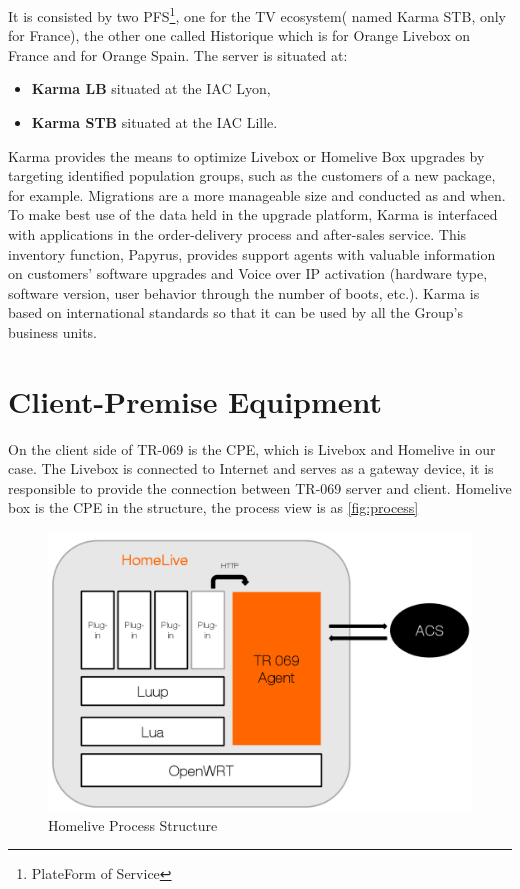 It is consisted by two PFS\footnote{PlateForm of Service}, one for the TV ecosystem( named Karma STB, only for France), the other one called Historique which is for Orange Livebox on France and for Orange Spain. The server is situated at:
\begin{itemize}
	\item \textbf{Karma LB} situated at the IAC Lyon,
	\item \textbf{Karma STB} situated at the IAC Lille.
\end{itemize}

Karma provides the means to optimize Livebox or Homelive Box upgrades by targeting identified population groups, such as the customers of a new package, for example. Migrations are a more manageable size and conducted as and when. To make best use of the data held in the upgrade platform, Karma is interfaced with applications in the order-delivery process and after-sales service. This inventory function, Papyrus, provides support agents with valuable information on customers’ software upgrades and Voice over IP activation (hardware type, software version, user behavior through the number of boots, etc.). Karma is based on international standards so that it can be used by all the Group’s business units.

\section{Client-Premise Equipment}
On the client side of TR-069 is the CPE, which is Livebox and Homelive in our case. The Livebox is connected to Internet and serves as a gateway device, it is responsible to provide the connection between TR-069 server and client. Homelive box is the CPE in the structure, the process view is as \autoref{fig:process}

\begin{figure}[htbp]
	\centering
		\includegraphics[width=12cm]{Figures/process.png}
	\caption[Homelive Process Structure]{Homelive Process Structure}
	\label{fig:process}
\end{figure}

